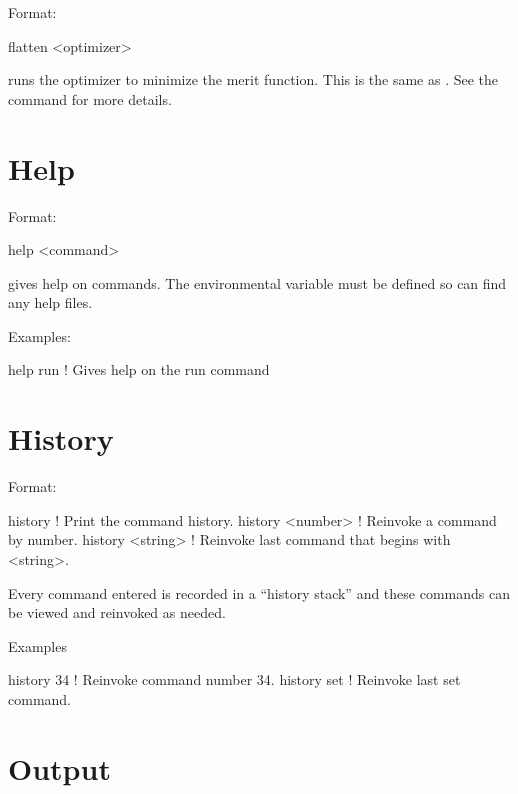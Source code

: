 Format:
\begin{example}
  flatten <optimizer>
\end{example}

\vskip 0.2in
 runs the optimizer to minimize the merit function. This is the 
same as . See the  command for more details.

\section{Help}
\label{s:help}

Format:
\begin{example}
  help <command>
\end{example}

\vskip 0.2in 
 gives help on \tao commands. The environmental
variable  must be defined so \tao can find any help files.

Examples:
\begin{example}
  help run   ! Gives help on the run command
\end{example}

\section{History}
\label{s:history}

Format:
\begin{example}
  history           ! Print the command history.
  history <number>  ! Reinvoke a command by number.
  history <string>  ! Reinvoke last command that begins with <string>.
\end{example}

\vskip 0.2in
Every \tao command entered is recorded in a ``history stack'' and
these commands can be viewed and reinvoked as needed. 

Examples
\begin{example}
  history 34   ! Reinvoke command number 34.
  history set  ! Reinvoke last set command.  
\end{example}

\section{Output}
\label{s:output}

